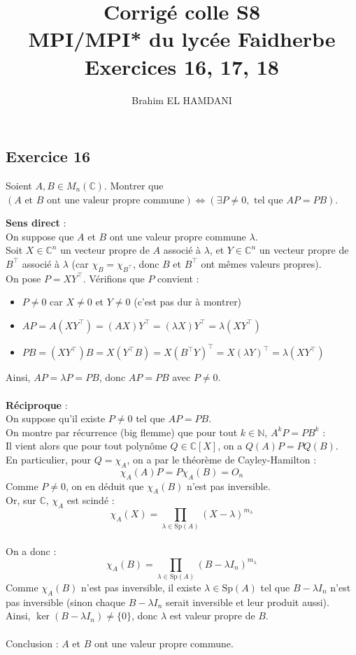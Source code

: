 \documentclass[a4paper,12pt]{article}
\title{Corrigé colle S8 \\
	MPI/MPI* du lycée Faidherbe \\
	\large Exercices 16, 17, 18}
\author{Brahim EL HAMDANI}
\begin{document}
	\maketitle
	
	\subsection*{Exercice 16}
    Soient $A, B \in M_n(\mathbb{C})$.
	Montrer que $(A \text{ et } B \text{ ont une valeur propre commune}) \iff (\exists P \neq 0, \text{ tel que } AP = PB)$.
	
	\begin{correctionbox}
		\textbf{Sens direct} : \\
		On suppose que $A$ et $B$ ont une valeur propre commune $\lambda$. \\
		Soit $X \in \mathbb{C}^n$ un vecteur propre de $A$ associé à $\lambda$, et $Y \in \mathbb{C}^n$ un vecteur propre de $B^\top$ associé à $\lambda$ (car $\chi_B = \chi_{B^\top}$, donc $B$ et $B^\top$ ont mêmes valeurs propres). \\
		On pose $P = X Y^\top$. Vérifions que $P$ convient :
		\begin{itemize}
			\item $P \neq 0$ car $X \neq 0$ et $Y \neq 0$ (c'est pas dur à montrer)
			\item $AP = A(X Y^\top) = (AX) Y^\top = (\lambda X) Y^\top = \lambda (X Y^\top)$
			\item $PB = (X Y^\top) B = X (Y^\top B) = X (B^\top Y)^\top = X (\lambda Y)^\top = \lambda (X Y^\top)$
		\end{itemize}
		Ainsi, $AP = \lambda P = PB$, donc $AP = PB$ avec $P \neq 0$.	
		\\\\
		\textbf{Réciproque} : \\
		On suppose qu'il existe $P \neq 0$ tel que $AP = PB$. \\ On montre par récurrence (big flemme) que pour tout $k \in \mathbb{N}$, $A^k P = P B^k$ :\\ Il vient alors que pour tout polynôme $Q \in \mathbb{C}[X]$, on a $Q(A)P = P Q(B)$.\\En particulier, pour $Q = \chi_A$, on a par le théorème de Cayley-Hamilton :
		$$\chi_A(A) P = P \chi_A(B) = O_n$$
		Comme $P \neq 0$, on en déduit que $\chi_A(B)$ n'est pas inversible. \\
		
		Or, sur $\mathbb{C}$, $\chi_A$ est scindé :
		$$\chi_A(X) = \prod_{\lambda \in \mathrm{Sp}(A)} (X - \lambda)^{m_\lambda}$$\\
		
		On a donc :
		$$\chi_A(B) = \prod_{\lambda \in \mathrm{Sp}(A)} (B - \lambda I_n)^{m_\lambda}$$
		Comme $\chi_A(B)$ n'est pas inversible, il existe $\lambda \in \mathrm{Sp}(A)$ tel que $B - \lambda I_n$ n'est pas inversible (sinon chaque $B - \lambda I_n$ serait inversible et leur produit aussi). \\ Ainsi, $\ker(B - \lambda I_n) \neq \{0\}$, donc $\lambda$ est valeur propre de $B$. \\\\Conclusion : $A$ et $B$ ont une valeur propre commune.
	\end{correctionbox}
\end{document}
